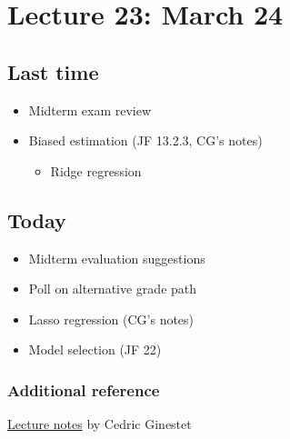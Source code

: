 \setcounter{section}{22}

\section{Lecture 23: March 24}


\subsection*{Last time}
\begin{itemize}
	\item Midterm exam review
\item Biased estimation (JF 13.2.3, CG's notes)
\begin{itemize}
	\item Ridge regression
\end{itemize}
\end{itemize}


\subsection*{Today}
\begin{itemize}
	\item Midterm evaluation suggestions
	\item Poll on alternative grade path
	\item Lasso regression (CG's notes)
	\item Model selection (JF 22)
\end{itemize}

\subsubsection*{Additional reference}
\href{https://math.bu.edu/people/cgineste/classes/ma575/p/w14_1.pdf}{Lecture notes} by Cedric Ginestet

